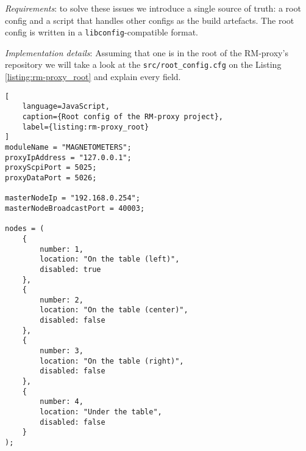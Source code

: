 \textit{Requirements}: to solve these issues we introduce a single source of truth: a root config and a script that handles other configs as the build artefacts. The root config is written in a \texttt{libconfig}-compatible format. 

\textit{Implementation details}: Assuming that one is in the root of the RM-proxy's repository we will take a look at the \texttt{src/root\_config.cfg} on the Listing \ref{listing:rm-proxy_root} and explain every field.

\begin{lstlisting}[
	language=JavaScript,
	caption={Root config of the RM-proxy project},
	label={listing:rm-proxy_root}
]
moduleName = "MAGNETOMETERS";
proxyIpAddress = "127.0.0.1";
proxyScpiPort = 5025;
proxyDataPort = 5026;

masterNodeIp = "192.168.0.254";
masterNodeBroadcastPort = 40003;

nodes = (
    {
        number: 1,
        location: "On the table (left)",
        disabled: true
    },
    {
        number: 2,
        location: "On the table (center)",
        disabled: false
    },
    {
        number: 3,
        location: "On the table (right)",
        disabled: false
    },
    {
        number: 4,
        location: "Under the table",
        disabled: false
    }
);
\end{lstlisting}

